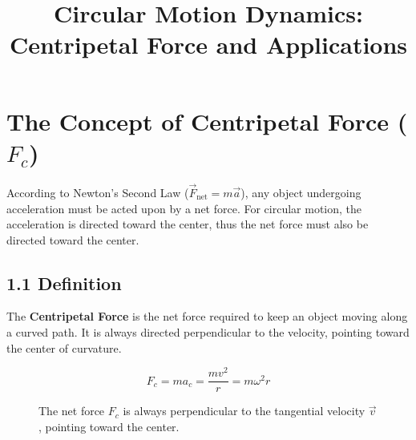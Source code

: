 \documentclass{article}
\begin{document}
\title{Circular Motion Dynamics: Centripetal Force and Applications}
\author{}
\date{}
\maketitle

\section{The Concept of Centripetal Force ($F_c$)}

According to Newton's Second Law ($\vec{F}_{\text{net}} = m\vec{a}$), any object undergoing acceleration must be acted upon by a net force. For circular motion, the acceleration is directed toward the center, thus the net force must also be directed toward the center.

\subsection*{1.1 Definition}
The \textbf{Centripetal Force} is the net force required to keep an object moving along a curved path. It is always directed perpendicular to the velocity, pointing toward the center of curvature.

\begin{equation}
  F_c = m a_c = \frac{mv^2}{r} = m\omega^2 r
  \label{eq:fc_formula}
\end{equation}

\begin{figure}[h]
    \centering
    \caption{The net force $F_c$ is always perpendicular to the tangential velocity $\vec{v}$, pointing toward the center.}
\end{figure}
\end{document}
